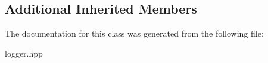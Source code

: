 \subsection*{Additional Inherited Members}


The documentation for this class was generated from the following file\+:\begin{DoxyCompactItemize}
\item 
logger.\+hpp\end{DoxyCompactItemize}
